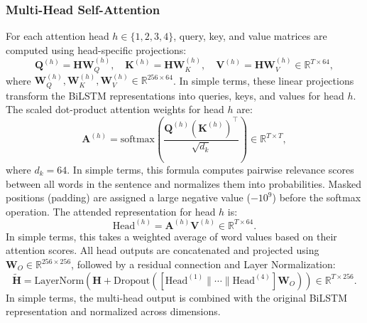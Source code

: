 \documentclass[pdflatex,sn-mathphys-num]{sn-jnl}
\begin{document}
\subsubsection{Multi-Head Self-Attention}
For each attention head $h \in \{1, 2, 3, 4\}$, query, key, and value matrices are computed using head-specific projections:
\begin{equation}
\mathbf{Q}^{(h)} = \mathbf{H} \mathbf{W}_Q^{(h)}, \quad
\mathbf{K}^{(h)} = \mathbf{H} \mathbf{W}_K^{(h)}, \quad
\mathbf{V}^{(h)} = \mathbf{H} \mathbf{W}_V^{(h)} \in \mathbb{R}^{T \times 64},
\end{equation}
where $\mathbf{W}_Q^{(h)}, \mathbf{W}_K^{(h)}, \mathbf{W}_V^{(h)} \in \mathbb{R}^{256 \times 64}$. In simple terms, these linear projections transform the BiLSTM representations into queries, keys, and values for head $h$. The scaled dot-product attention weights for head $h$ are:
\begin{equation}
\mathbf{A}^{(h)} = \text{softmax}\left(\frac{\mathbf{Q}^{(h)} (\mathbf{K}^{(h)})^\top}{\sqrt{d_k}}\right) \in \mathbb{R}^{T \times T},
\end{equation}
where $d_k = 64$. In simple terms, this formula computes pairwise relevance scores between all words in the sentence and normalizes them into probabilities. Masked positions (padding) are assigned a large negative value ($-10^9$) before the softmax operation. The attended representation for head $h$ is:
\begin{equation}
\text{Head}^{(h)} = \mathbf{A}^{(h)} \mathbf{V}^{(h)} \in \mathbb{R}^{T \times 64}.
\end{equation}
In simple terms, this takes a weighted average of word values based on their attention scores. All head outputs are concatenated and projected using $\mathbf{W}_O \in \mathbb{R}^{256 \times 256}$, followed by a residual connection and Layer Normalization:
\begin{equation}
\tilde{\mathbf{H}} = \text{LayerNorm}\left(\mathbf{H} + \text{Dropout}\left([\text{Head}^{(1)} \parallel \cdots \parallel \text{Head}^{(4)}] \mathbf{W}_O\right)\right) \in \mathbb{R}^{T \times 256}.
\end{equation}
In simple terms, the multi-head output is combined with the original BiLSTM representation and normalized across dimensions.
\end{document}
